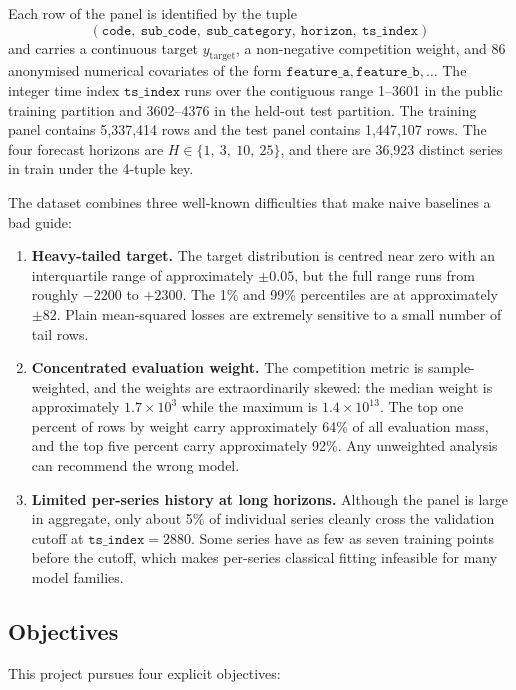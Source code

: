 Each row of the panel is identified by the tuple
\[
(\mathtt{code},\ \mathtt{sub\_code},\ \mathtt{sub\_category},\ \mathtt{horizon},\ \mathtt{ts\_index})
\]
and carries a continuous target $y_{\text{target}}$, a non-negative competition weight, and 86 anonymised numerical covariates of the form $\mathtt{feature\_a}, \mathtt{feature\_b}, \ldots$ The integer time index $\mathtt{ts\_index}$ runs over the contiguous range 1--3601 in the public training partition and 3602--4376 in the held-out test partition. The training panel contains 5{,}337{,}414 rows and the test panel contains 1{,}447{,}107 rows. The four forecast horizons are $H \in \{1,\ 3,\ 10,\ 25\}$, and there are 36{,}923 distinct series in train under the 4-tuple key.

The dataset combines three well-known difficulties that make naive baselines a bad guide:

\begin{enumerate}
  \item \textbf{Heavy-tailed target.} The target distribution is centred near zero with an interquartile range of approximately $\pm 0.05$, but the full range runs from roughly $-2200$ to $+2300$. The 1\% and 99\% percentiles are at approximately $\pm 82$. Plain mean-squared losses are extremely sensitive to a small number of tail rows.
  \item \textbf{Concentrated evaluation weight.} The competition metric is sample-weighted, and the weights are extraordinarily skewed: the median weight is approximately $1.7 \times 10^{3}$ while the maximum is $1.4 \times 10^{13}$. The top one percent of rows by weight carry approximately 64\% of all evaluation mass, and the top five percent carry approximately 92\%. Any unweighted analysis can recommend the wrong model.
  \item \textbf{Limited per-series history at long horizons.} Although the panel is large in aggregate, only about 5\% of individual series cleanly cross the validation cutoff at $\mathtt{ts\_index} = 2880$. Some series have as few as seven training points before the cutoff, which makes per-series classical fitting infeasible for many model families.
\end{enumerate}

\subsection{Objectives}
\label{sec:intro:objectives}

This project pursues four explicit objectives:

